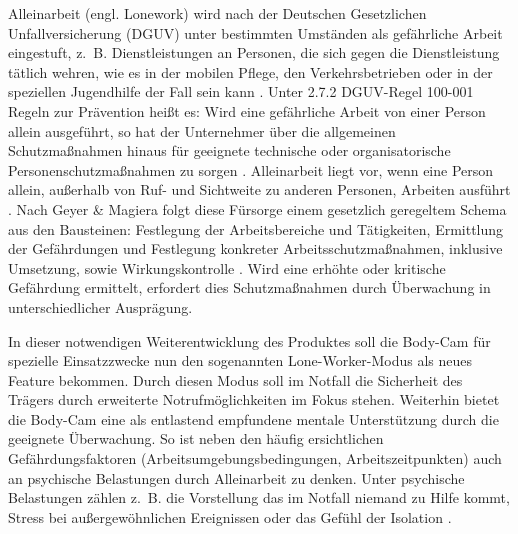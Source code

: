 \documentclass[thesis.tex]{subfiles}
\begin{document}
Alleinarbeit (engl. Lonework) wird nach der Deutschen Gesetzlichen Unfallversicherung (DGUV) unter bestimmten Umständen als gefährliche Arbeit eingestuft, z.~B. Dienstleistungen an Personen, die sich gegen die Dienstleistung tätlich wehren, wie es in der mobilen Pflege, den Verkehrsbetrieben oder in der speziellen Jugendhilfe der Fall sein kann \cite[§~8][]{Vorschrift1_DGUV}.
Unter 2.7.2 DGUV-Regel 100-001 \glqq Regeln zur Prävention\grqq{} heißt es: \glqq Wird eine gefährliche Arbeit von einer Person allein ausgeführt, so hat der Unternehmer über die allgemeinen Schutzmaßnahmen hinaus für geeignete technische oder organisatorische Personenschutzmaßnahmen zu sorgen\grqq{} \cite[§~8~(2)][]{Vorschrift1_DGUV}.
\glqq Alleinarbeit liegt vor, wenn eine Person allein, außerhalb von Ruf- und Sichtweite zu anderen Personen, Arbeiten ausführt\grqq{} \cite[S.~42][]{Regel_100-001}.
Nach Geyer \& Magiera folgt diese Fürsorge einem gesetzlich geregeltem Schema aus den Bausteinen: Festlegung der Arbeitsbereiche und Tätigkeiten, Ermittlung der Gefährdungen und Festlegung konkreter Arbeitsschutzmaßnahmen, inklusive Umsetzung, sowie Wirkungskontrolle \cite[vgl.~S.~42~ff.][]{GeyerMagiera2022}.
Wird eine erhöhte oder kritische Gefährdung ermittelt, erfordert dies Schutzmaßnahmen durch Überwachung in unterschiedlicher Ausprägung.

In dieser notwendigen Weiterentwicklung des Produktes soll die Body-Cam für spezielle Einsatzzwecke nun den sogenannten Lone-Worker-Modus als neues Feature bekommen.
Durch diesen Modus soll im Notfall die Sicherheit des Trägers durch erweiterte Notrufmöglichkeiten im Fokus stehen.
Weiterhin bietet die Body-Cam eine als entlastend empfundene mentale Unterstützung durch die geeignete Überwachung.
So ist neben den häufig ersichtlichen Gefährdungsfaktoren (Arbeitsumgebungsbedingungen, Arbeitszeitpunkten) auch an psychische Belastungen durch Alleinarbeit zu denken.
Unter psychische Belastungen zählen z.~B. die Vorstellung das im Notfall niemand zu Hilfe kommt, Stress bei außergewöhnlichen Ereignissen oder das Gefühl der Isolation \cite[vgl.~S.~45][]{GeyerMagiera2022}.
\end{document}
